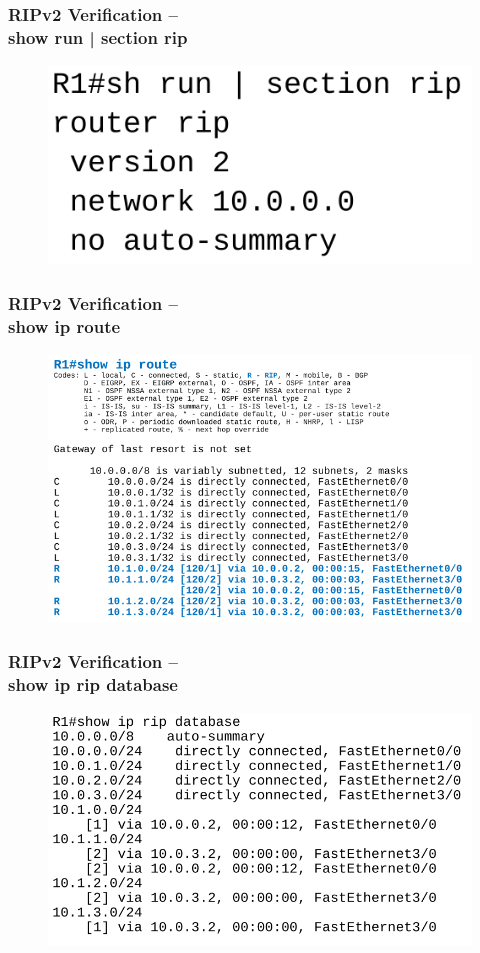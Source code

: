 \documentclass[pdflatex,compress,mathserif]{beamer}
\begin{document}
\begin{frame}
	\frametitle{RIPv2 Verification – \\show run | section rip}
	\begin{figure}
		\centering
		\includegraphics[width=0.8\linewidth]{img/img05}
	\end{figure}
\end{frame}

\begin{frame}
	\frametitle{RIPv2 Verification – \\show ip route}
	\begin{figure}
		\centering
		\includegraphics[width=0.8\linewidth]{img/img06}
	\end{figure}
\end{frame}

\begin{frame}
	\frametitle{RIPv2 Verification – \\show ip rip database}
	\begin{figure}
		\centering
		\includegraphics[width=0.8\linewidth]{img/img07}
	\end{figure}
\end{frame}
\end{document}
